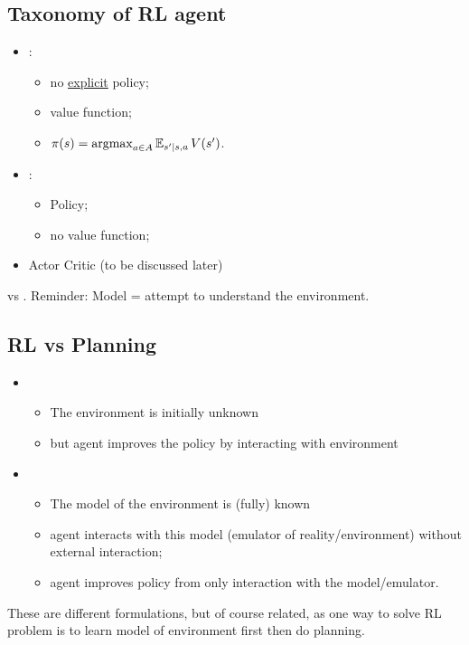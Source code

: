 \subsection{Taxonomy of RL agent}
\begin{itemize}
	\item {}: 
	\begin{itemize}
		\item no \underline{explicit} policy;
		\item value function;
		\item $\pi(s) = \operatorname*{argmax}_{a \in A} \operatorname{\mathbb{E}}_{s'|s,a} V(s')$.
	\end{itemize}
	\item {}:
	\begin{itemize}
		\item Policy;
		\item no value function;
	\end{itemize}
	\item Actor Critic (to be discussed later)
\end{itemize}


 vs . Reminder: Model = attempt to understand the environment.

\subsection{RL vs Planning}
\begin{itemize}
	\item {}
	\begin{itemize}
		\item The environment is initially unknown
		\item but agent improves the policy by interacting with environment
	\end{itemize}
	\item {}
	\begin{itemize}
		\item The model of the environment is (fully) known
		\item agent interacts with this model (emulator of reality/environment) without external interaction;
		\item agent improves policy from only interaction with the model/emulator.
	\end{itemize}
\end{itemize}

These are different formulations, but of course related, as one way to solve RL problem is to learn model of environment first then do planning.

